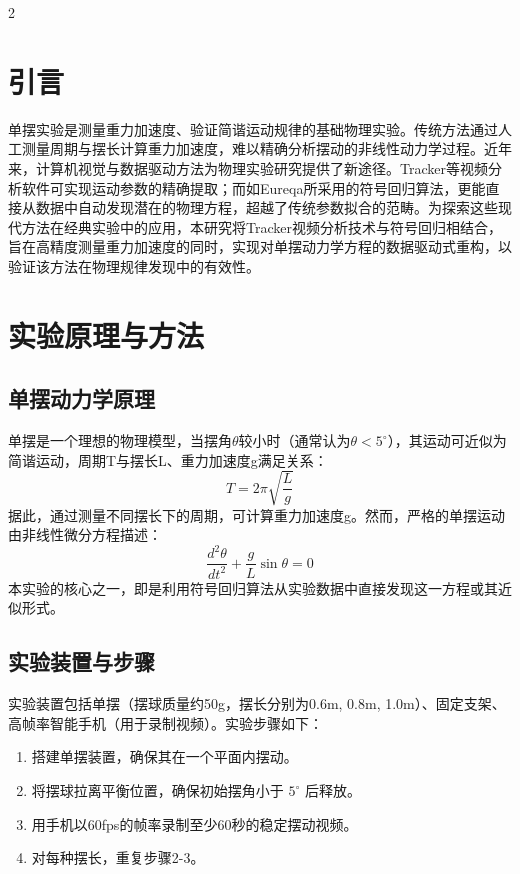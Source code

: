 \documentclass[12pt,a4paper]{article}
\begin{document}
\begin{multicols}{2}

    \section*{\heiti 引言}
    \songti
    \setlength{\parindent}{2em}

    单摆实验是测量重力加速度、验证简谐运动规律的基础物理实验。传统方法通过人工测量周期与摆长计算重力加速度，难以精确分析摆动的非线性动力学过程。近年来，计算机视觉与数据驱动方法为物理实验研究提供了新途径。Tracker等视频分析软件可实现运动参数的精确提取；而如Eureqa所采用的符号回归算法，更能直接从数据中自动发现潜在的物理方程，超越了传统参数拟合的范畴。为探索这些现代方法在经典实验中的应用，本研究将Tracker视频分析技术与符号回归相结合，旨在高精度测量重力加速度的同时，实现对单摆动力学方程的数据驱动式重构，以验证该方法在物理规律发现中的有效性。
    \section{\heiti 实验原理与方法}
    \subsection{\heiti 单摆动力学原理}
    \songti
    单摆是一个理想的物理模型，当摆角$\theta$较小时（通常认为$\theta<5^{\circ}$），其运动可近似为简谐运动，周期T与摆长L、重力加速度g满足关系：
    \begin{equation}
        T=2\pi\sqrt{\frac{L}{g}}
    \end{equation}
    据此，通过测量不同摆长下的周期，可计算重力加速度g。然而，严格的单摆运动由非线性微分方程描述：
    \begin{equation}
        \frac{d^2\theta}{dt^2}+\frac{g}{L}\sin\theta=0
    \end{equation}
    本实验的核心之一，即是利用符号回归算法从实验数据中直接发现这一方程或其近似形式。

\subsection{\heiti 实验装置与步骤}

实验装置包括单摆（摆球质量约50g，摆长分别为0.6m, 0.8m, 1.0m）、固定支架、高帧率智能手机（用于录制视频）。实验步骤如下：
\begin{enumerate}
\item 搭建单摆装置，确保其在一个平面内摆动。
\item 将摆球拉离平衡位置，确保初始摆角小于 $5^\circ$ 后释放。
\item 用手机以60fps的帧率录制至少60秒的稳定摆动视频。
\item 对每种摆长，重复步骤2-3。
\end{enumerate}

\end{multicols}
\end{document}
